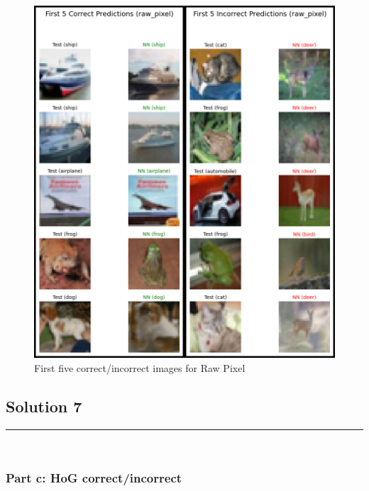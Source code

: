 \documentclass{article}
\begin{document}
\begin{figure}[h]
  \includegraphics[height=0.75\textheight,width=\textwidth]{raw_pixel.png}
  \caption{First five correct/incorrect images for Raw Pixel}
\end{figure}

\newpage

\subsection*{Solution 7}
\noindent\rule{\textwidth}{0.4pt}\\
\subsubsection*{Part c:  HoG correct/incorrect}
\end{document}
